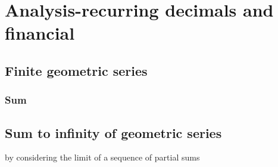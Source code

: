 \chapter{Analysis-recurring
decimals and financial}

\section{Finite geometric series}
\subsection{Sum}



\section{Sum
to infinity of geometric series }
by
considering the limit of a sequence of
partial sums

